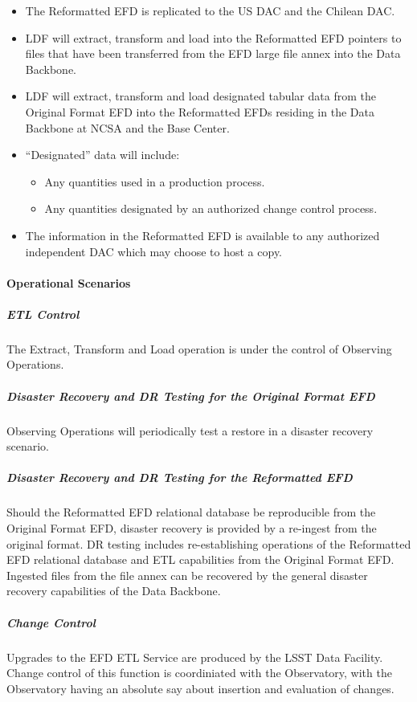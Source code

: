 \begin{itemize}
\item The Reformatted EFD is replicated to the US DAC and the Chilean DAC.
\item LDF will extract, transform and load into the Reformatted EFD pointers to files 
that have been transferred from the EFD large file annex into the Data Backbone. 
\item LDF will extract, transform and load designated tabular data from the 
Original Format EFD into the Reformatted EFDs residing in the Data Backbone at 
NCSA and the Base Center. 
\item “Designated” data will include:
  \begin{itemize}
  \item Any quantities used in a production process.
  \item Any quantities designated by an authorized change control process.
  \end{itemize}
\item The information in the Reformatted EFD is available to any authorized independent 
DAC which may choose to host a copy.
\end{itemize}

\paragraph{Operational Scenarios}

\subparagraph{ETL Control} 

The Extract, Transform and Load operation is under the control of Observing Operations.  

\subparagraph{Disaster Recovery and DR Testing for the Original Format EFD} 

Observing Operations will periodically test a restore in a disaster recovery scenario. 

\subparagraph{Disaster Recovery and DR Testing for the Reformatted EFD} 

Should the Reformatted EFD relational database be reproducible from the 
Original Format EFD, disaster recovery is provided by a re-ingest from the 
original format. DR testing includes re-establishing operations of the Reformatted 
EFD relational database and ETL capabilities from the Original Format EFD. Ingested 
files from the file annex can be recovered by the general disaster recovery capabilities 
of the Data Backbone.

\subparagraph{Change Control}

Upgrades to the EFD ETL Service are produced by the LSST Data Facility. 
Change control of this function is coordiniated with the Observatory, with the 
Observatory having an absolute say about insertion and evaluation of changes.
